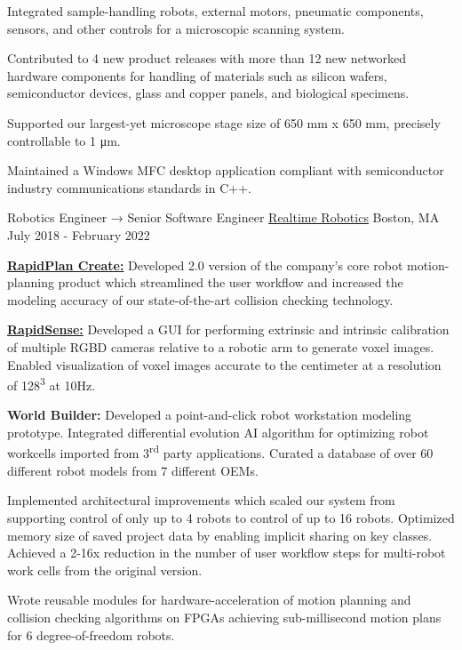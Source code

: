 \begin{cventries}
{\begin{cvitems}
        \item{Integrated sample-handling robots, external motors, pneumatic components, sensors, and other controls for a microscopic scanning system.}
        \item{Contributed to 4 new product releases with more than 12 new networked hardware components for handling of materials such as silicon wafers, semiconductor devices, glass and copper panels, and biological specimens.}
        \item{Supported our largest-yet microscope stage size of 650 mm x 650 mm, precisely controllable to 1 μm.}
        \item{Maintained a Windows MFC desktop application compliant with semiconductor industry communications standards in C++.}
      \end{cvitems}
    }
  \cventry
    {Robotics Engineer → Senior Software Engineer}
    {\href{https://rtr.ai/}{Realtime Robotics}}
    {Boston, MA}
    {July 2018 - February 2022}
    {
    \begin{cvitems}
        \item{\textbf{\href{https://rtr.ai/solutions/rapidplan/}{RapidPlan Create:}} Developed 2.0 version of the company's core robot motion-planning product which streamlined the user workflow and increased the modeling accuracy of our state-of-the-art collision checking technology.}
        \item{\textbf{\href{https://rtr.ai/solutions/rapidsense/}{RapidSense:}} Developed a GUI for performing extrinsic and intrinsic calibration of multiple RGBD cameras relative to a robotic arm to generate voxel images. Enabled visualization of voxel images accurate to the centimeter at a resolution of 128\textsuperscript{3} at 10Hz.}
        \item{\textbf{World Builder:} Developed a point-and-click robot workstation modeling prototype. Integrated differential evolution AI algorithm for optimizing robot workcells imported from 3\textsuperscript{rd} party applications. Curated a database of over 60 different robot models from 7 different OEMs.}
        \item{Implemented architectural improvements which scaled our system from supporting control of only up to 4 robots to control of up to 16 robots. Optimized memory size of saved project data by enabling implicit sharing on key classes. Achieved a 2-16x reduction in the number of user workflow steps for multi-robot work cells from the original version.}
        \item{Wrote reusable modules for hardware-acceleration of motion planning and collision checking algorithms on FPGAs achieving sub-millisecond motion plans for 6 degree-of-freedom robots.}

\end{cvitems}}
\end{cventries}
